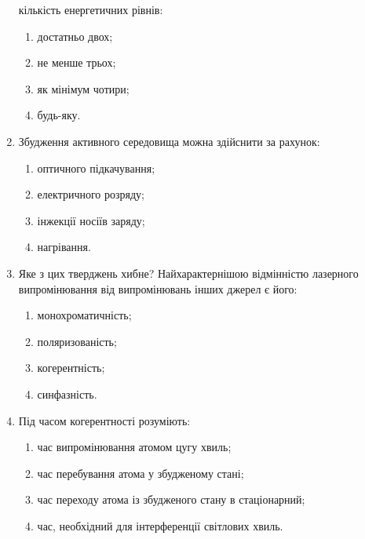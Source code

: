\documentclass[twocolumn]{el-author}
\begin{document}
\begin{enumerate}
кількість енергетичних рівнів:
	\begin{enumerate}
		\item достатньо двох;
		\item не менше трьох;
		\item як мінімум чотири;
		\item будь-яку.
	\end{enumerate}
	\item Збудження активного середовища можна здійснити за рахунок:
	\begin{enumerate}
		\item оптичного підкачування;
		\item електричного розряду;
		\item інжекції носіїв заряду;
		\item нагрівання.
	\end{enumerate}
	\item Яке з цих тверджень хибне?
	Найхарактернішою відмінністю лазерного випромінювання від
випромінювань інших джерел є його:
	\begin{enumerate}
		\item монохроматичність;
		\item поляризованість;
		\item когерентність;
		\item синфазність.
	\end{enumerate}
	\item Під часом когерентності розуміють:
	\begin{enumerate}
		\item час випромінювання атомом цугу хвиль;
		\item час перебування атома у збудженому стані;
		\item час переходу атома із збудженого стану в стаціонарний;
		\item час, необхідний для інтерференції світлових хвиль.
	\end{enumerate}
\end{enumerate}
\newpage
~
\end{document}
